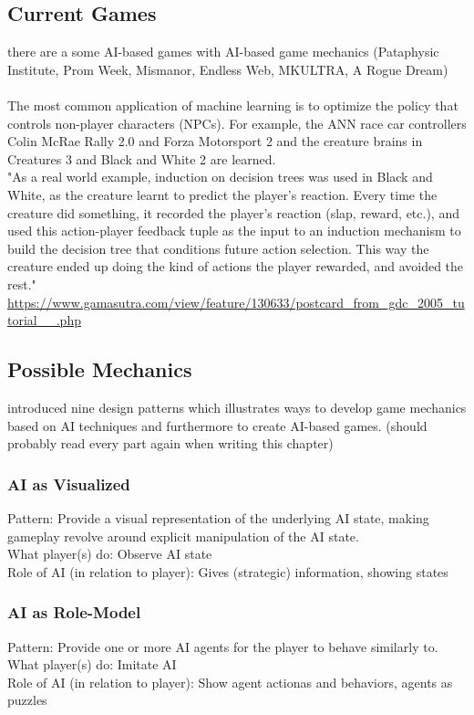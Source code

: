 \documentclass[MGS,Master,english]{twbook}%
\begin{document}
\subsection{Current Games}
there are a some AI-based games with AI-based game mechanics (Pataphysic Institute, Prom Week, Mismanor, Endless Web, MKULTRA, A Rogue Dream) \cite{ai::aiBasedGameDesignPattern}\\
\\
The most common application of machine learning is to optimize the policy that controls non-player characters (NPCs). For example, the ANN race car controllers Colin McRae Rally 2.0 and Forza Motorsport 2 and the creature brains in Creatures 3 and Black and White 2 are learned. \protect\cite{pcg::galacticArmsRace::evolvingContent}\\
"As a real world example, induction on decision trees was used in Black and White, as the creature learnt to predict the player's reaction. Every time the creature did something, it recorded the player's reaction (slap, reward, etc.), and used this action-player feedback tuple as the input to an induction mechanism to build the decision tree that conditions future action selection. This way the creature ended up doing the kind of actions the player rewarded, and avoided the rest." \url{https://www.gamasutra.com/view/feature/130633/postcard_from_gdc_2005_tutorial__.php}
\subsection{Possible Mechanics}
\cite{ai::aiBasedGameDesignPattern} introduced nine design patterns which illustrates ways to develop game mechanics based on AI techniques and furthermore to create AI-based games. (should probably read every part again when writing this chapter)

\subsubsection{AI as Visualized}
Pattern: Provide a visual representation of the underlying AI state, making gameplay revolve around explicit manipulation of the AI state.\\
What player(s) do: Observe AI state\\
Role of AI (in relation to player): Gives (strategic) information, showing states
\subsubsection{AI as Role-Model}
Pattern: Provide one or more AI agents for the player to behave similarly to.\\
What player(s) do: Imitate AI\\
Role of AI (in relation to player): Show agent actionas and behaviors, agents as puzzles
\end{document}
